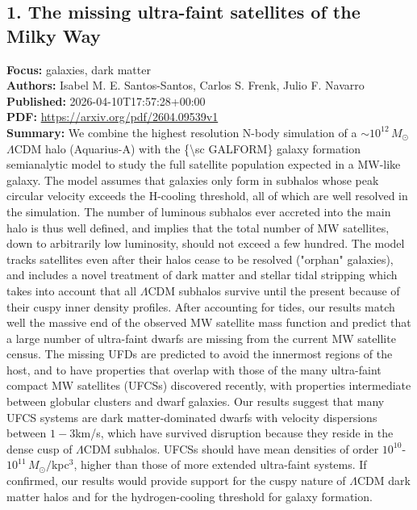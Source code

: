 \documentclass[11pt]{article}
\begin{document}
\subsection*{1. The missing ultra-faint satellites of the Milky Way}
\textbf{Focus:} galaxies, dark matter\\
\textbf{Authors:} Isabel M. E. Santos-Santos, Carlos S. Frenk, Julio F. Navarro\\
\textbf{Published:} 2026-04-10T17:57:28+00:00\\
\textbf{PDF:} \href{https://arxiv.org/pdf/2604.09539v1}{https://arxiv.org/pdf/2604.09539v1}\\
\textbf{Summary:}
We combine the highest resolution N-body simulation of a $\sim 10^{12}\, M_\odot$ $Λ$CDM halo (Aquarius-A) with the \{\textbackslash{}sc GALFORM\} galaxy formation semianalytic model to study the full satellite population expected in a MW-like galaxy. The model assumes that galaxies only form in subhalos whose peak circular velocity exceeds the H-cooling threshold, all of which are well resolved in the simulation. The number of luminous subhalos ever accreted into the main halo is thus well defined, and implies that the total number of MW satellites, down to arbitrarily low luminosity, should not exceed a few hundred. The model tracks satellites even after their halos cease to be resolved ("orphan" galaxies), and includes a novel treatment of dark matter and stellar tidal stripping which takes into account that all $Λ$CDM subhalos survive until the present because of their cuspy inner density profiles. After accounting for tides, our results match well the massive end of the observed MW satellite mass function and predict that a large number of ultra-faint dwarfs are missing from the current MW satellite census. The missing UFDs are predicted to avoid the innermost regions of the host, and to have properties that overlap with those of the many ultra-faint compact MW satellites (UFCSs) discovered recently, with properties intermediate between globular clusters and dwarf galaxies. Our results suggest that many UFCS systems are dark matter-dominated dwarfs with velocity dispersions between $1-3$km/s, which have survived disruption because they reside in the dense cusp of $Λ$CDM subhalos. UFCSs should have mean densities of order $10^{10}$-$10^{11}\,M_\odot/$kpc$^3$, higher than those of more extended ultra-faint systems. If confirmed, our results would provide support for the cuspy nature of $Λ$CDM dark matter halos and for the hydrogen-cooling threshold for galaxy formation.
\newpage
\end{document}
